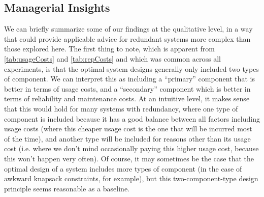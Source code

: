 \documentclass[11pt,authoryear,a4paper]{article}
\theoremstyle{definition}
\begin{document}



{\subsection{Managerial Insights}
We can briefly summarize some of our findings at the qualitative level, in a way that could provide applicable advice for redundant systems more complex than those explored here. The first thing to note, which is apparent from \autoref{tab:usageCosts} and \autoref{tab:repCosts} and which was common across all experiments, is that the optimal system designs generally only included two types of component. We can interpret this as including a ``primary'' component that is better in terms of usage costs, and a ``secondary'' component which is better in terms of reliability and maintenance costs. At an intuitive level, it makes sense that this would hold for many systems with redundancy, where one type of component is included because it has a good balance between all factors including usage costs (where this cheaper usage cost is the one that will be incurred most of the time), and another type will be included for reasons other than its usage cost (i.e. where we don't mind occasionally paying this higher usage cost, because this won't happen very often). Of course, it may sometimes be the case that the optimal design of a system includes more types of component (in the case of awkward knapsack constraints, for example), but this two-component-type design principle seems reasonable as a baseline. 

}
\end{document}
